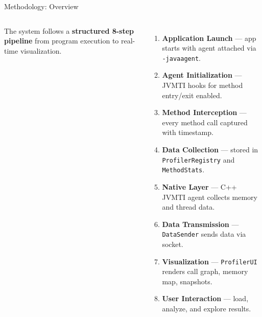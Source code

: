 \documentclass[aspectratio=169]{beamer}
\begin{document}
\begin{frame}{Methodology: Overview}
  \begin{columns}[T]
      \small
      The system follows a \textbf{structured 8-step pipeline} from
      program execution to real-time visualization.
      \vspace{6pt}
      \begin{enumerate}\itemsep3pt\scriptsize
        \item \textbf{Application Launch} — app starts with agent attached via \texttt{-javaagent}.
        \item \textbf{Agent Initialization} — JVMTI hooks for method entry/exit enabled.
        \item \textbf{Method Interception} — every method call captured with timestamp.
        \item \textbf{Data Collection} — stored in \texttt{ProfilerRegistry} and \texttt{MethodStats}.
        \item \textbf{Native Layer} — C++ JVMTI agent collects memory and thread data.
        \item \textbf{Data Transmission} — \texttt{DataSender} sends data via socket.
        \item \textbf{Visualization} — \texttt{ProfilerUI} renders call graph, memory map, snapshots.
        \item \textbf{User Interaction} — load, analyze, and explore results.
      \end{enumerate}
  \end{columns}
\end{frame}
\end{document}
